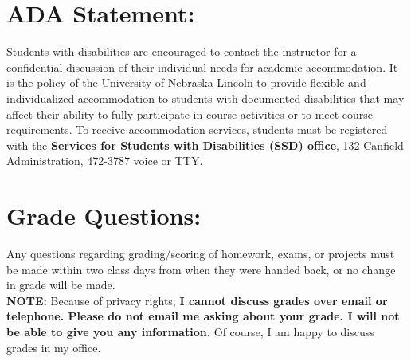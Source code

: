 \documentclass[margin]{res}
\theoremstyle{plain}
\theoremstyle{definition}
\theoremstyle{remark}
\begin{document}
\begin{resume}
\section{ADA  Statement:} Students with disabilities are encouraged to contact the instructor for a confidential discussion of their individual needs for academic accommodation. It is the policy of the University of Nebraska-Lincoln to provide flexible and individualized accommodation to students with documented disabilities that may affect their ability to fully participate in course activities or to meet course requirements. To receive accommodation services, students must be registered with the  {\bf Services for Students with Disabilities (SSD) office}, 132 Canfield Administration, 472-3787 voice or TTY. 


\section{Grade Questions:} 
Any questions regarding grading/scoring of homework, exams, or projects must be made within two class days from when they were handed back, or no change in grade will be made.  
\\\textbf{NOTE:} Because of privacy rights, \textbf{I cannot discuss grades over email or telephone. Please do not email me asking about your grade.  I will not be able to give you any information.}  Of course, I am happy to discuss grades in my office.


\end{resume}
\end{document}
